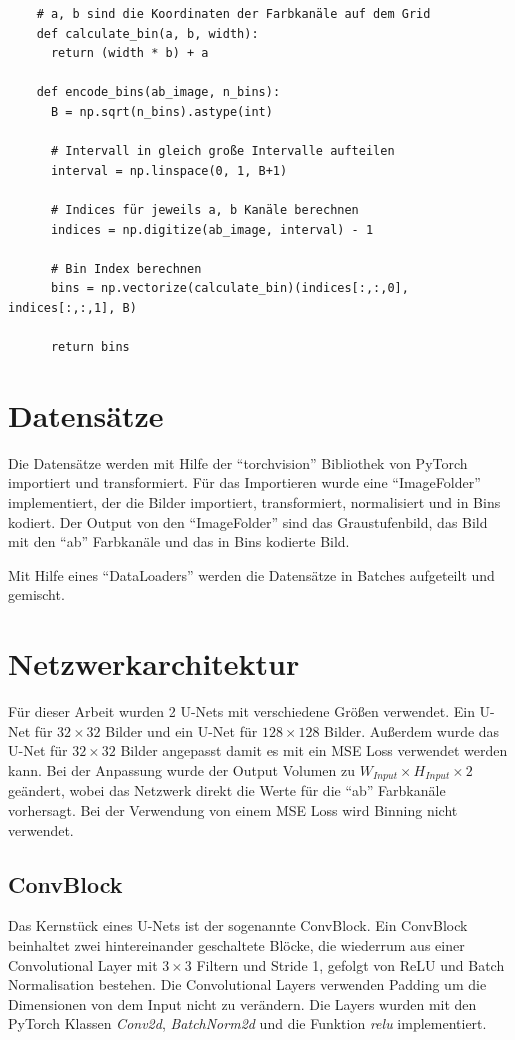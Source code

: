 \begin{listing}[H]
  \begin{verbatim}
    # a, b sind die Koordinaten der Farbkanäle auf dem Grid
    def calculate_bin(a, b, width):
      return (width * b) + a
  
    def encode_bins(ab_image, n_bins):
      B = np.sqrt(n_bins).astype(int)
  
      # Intervall in gleich große Intervalle aufteilen
      interval = np.linspace(0, 1, B+1)
  
      # Indices für jeweils a, b Kanäle berechnen
      indices = np.digitize(ab_image, interval) - 1
  
      # Bin Index berechnen
      bins = np.vectorize(calculate_bin)(indices[:,:,0], indices[:,:,1], B)
  
      return bins
  \end{verbatim}
\end{listing}

\section{Datensätze}
Die Datensätze werden mit Hilfe der ``torchvision'' Bibliothek von PyTorch importiert und transformiert. Für das Importieren wurde eine
``ImageFolder'' implementiert, der die Bilder importiert, transformiert, normalisiert und in Bins kodiert. Der Output von den ``ImageFolder''
sind das Graustufenbild, das Bild mit den ``ab'' Farbkanäle und das in Bins kodierte Bild.

Mit Hilfe eines ``DataLoaders'' werden die Datensätze in Batches aufgeteilt und gemischt.

\section{Netzwerkarchitektur}
Für dieser Arbeit wurden 2 U-Nets mit verschiedene Größen verwendet. Ein U-Net für $ 32 \times 32 $ Bilder und ein U-Net für $ 128 \times 128 $ 
Bilder. Außerdem wurde das U-Net für $ 32 \times 32 $ Bilder angepasst damit es mit ein MSE Loss verwendet werden kann. Bei der Anpassung wurde
der Output Volumen zu $ W_{Input} \times H_{Input} \times 2 $ geändert, wobei das Netzwerk direkt die Werte für die ``ab'' Farbkanäle vorhersagt.
Bei der Verwendung von einem MSE Loss wird Binning nicht verwendet.

\subsection{ConvBlock}
Das Kernstück eines U-Nets ist der sogenannte ConvBlock. Ein ConvBlock beinhaltet zwei hintereinander geschaltete Blöcke, die wiederrum
aus einer Convolutional Layer mit $3 \times 3$ Filtern und Stride 1, gefolgt von ReLU und Batch Normalisation bestehen. 
Die Convolutional Layers verwenden Padding um die Dimensionen von dem Input nicht zu verändern. Die Layers wurden mit den PyTorch 
Klassen \textit{Conv2d}, \textit{BatchNorm2d} und die Funktion \textit{relu} implementiert.

